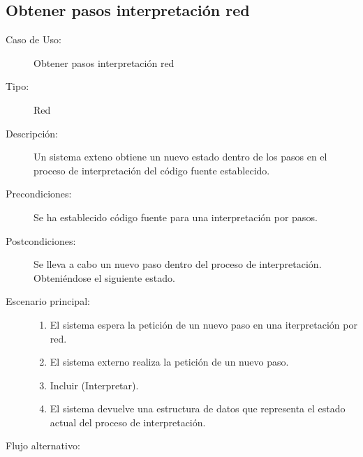 \subsection{Obtener pasos interpretación red} 
\begin{framed}
\FloatBarrier
\begin{description}
   \item[Caso de Uso:]  Obtener pasos interpretación red 
   \item [Tipo:] Red
   \item[Descripción:] 
   Un sistema exteno obtiene un nuevo estado dentro de los pasos en el proceso de
   interpretación del código fuente establecido.
   \item[Precondiciones:] 
   Se ha establecido código fuente para una interpretación por pasos.
   \item[Postcondiciones:] 
   Se lleva a cabo un nuevo paso dentro del proceso de interpretación. Obteniéndose el 
   siguiente estado.
   \item[Escenario principal:] \hfill
   \begin{enumerate}
   \item El sistema espera la petición de un nuevo paso en una iterpretación por red.
   \item El sistema externo realiza la petición de un nuevo paso.
   \item Incluir (Interpretar).
   \item El sistema devuelve una estructura de datos que representa 
   el estado actual del proceso de interpretación.
   \end{enumerate}
   \item[Flujo alternativo:] \hfill 

\end{description}
\end{framed}
